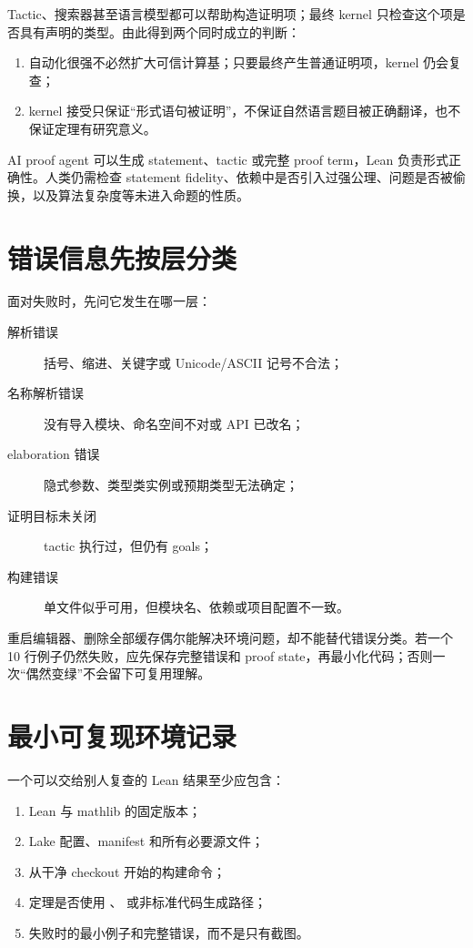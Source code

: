 Tactic、搜索器甚至语言模型都可以帮助构造证明项；最终 kernel 只检查这个项是否具有声明的类型。由此得到两个同时成立的判断：
\begin{enumerate}
  \item 自动化很强不必然扩大可信计算基；只要最终产生普通证明项，kernel 仍会复查；
  \item kernel 接受只保证“形式语句被证明”，不保证自然语言题目被正确翻译，也不保证定理有研究意义。
\end{enumerate}

\begin{aibox}
AI proof agent 可以生成 statement、tactic 或完整 proof term，Lean 负责形式正确性。人类仍需检查 statement fidelity、依赖中是否引入过强公理、问题是否被偷换，以及算法复杂度等未进入命题的性质。
\end{aibox}

\section{错误信息先按层分类}

面对失败时，先问它发生在哪一层：
\begin{description}
  \item[解析错误] 括号、缩进、关键字或 Unicode/ASCII 记号不合法；
  \item[名称解析错误] 没有导入模块、命名空间不对或 API 已改名；
  \item[elaboration 错误] 隐式参数、类型类实例或预期类型无法确定；
  \item[证明目标未关闭] tactic 执行过，但仍有 goals；
  \item[构建错误] 单文件似乎可用，但模块名、依赖或项目配置不一致。
\end{description}

\begin{warningbox}
重启编辑器、删除全部缓存偶尔能解决环境问题，却不能替代错误分类。若一个 10 行例子仍然失败，应先保存完整错误和 proof state，再最小化代码；否则一次“偶然变绿”不会留下可复用理解。
\end{warningbox}

\section{最小可复现环境记录}

一个可以交给别人复查的 Lean 结果至少应包含：
\begin{enumerate}
  \item Lean 与 mathlib 的固定版本；
  \item Lake 配置、manifest 和所有必要源文件；
  \item 从干净 checkout 开始的构建命令；
  \item 定理是否使用 、 或非标准代码生成路径；
  \item 失败时的最小例子和完整错误，而不是只有截图。
\end{enumerate}

